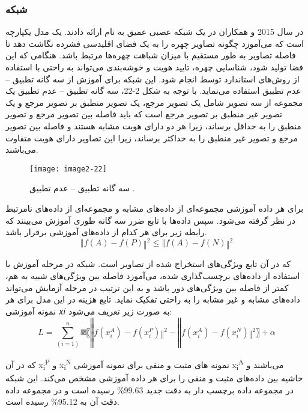 \subsubsection{	شبکه }
در سال 2015  و همکاران در \cite{7298682} یک شبکه عصبی عمیق به نام  ارائه دادند.  یک مدل یکپارچه است که می‌آموزد چگونه تصاویر چهره را به یک فضای اقلیدسی فشرده نگاشت دهد تا فاصله تصاویر به طور مستقیم با میزان شباهت چهره‌ها مرتبط باشد. هنگامی که این فضا تولید شود، شناسایی چهره، تایید هویت و خوشه‌بندی می‌تواند به راحتی با استفاده از روش‌های استاندارد توسط  انجام شود. این شبکه برای آموزش از سه گانه تطبیق – عدم تطبیق استفاده می‌نماید. با توجه به شکل 2-22، سه گانه تطبیق – عدم تطبیق یک مجموعه از سه تصویر شامل یک تصویر مرجع، یک تصویر منطبق بر تصویر مرجع و یک تصویر غیر منطبق بر تصویر مرجع است که باید فاصله بین تصویر مرجع و تصویر منطبق را به حداقل برساند، زیرا هر دو دارای هویت مشابه هستند و فاصله بین تصویر مرجع و تصویر غیر منطبق را به حداکثر برساند، زیرا این تصاویر دارای هویت متفاوت می‌باشند. 
 
 \begin{figure}[h]
\centering
  \texttt{[image: image2-22]}
  \caption{سه گانه تطبیق – عدم تطبیق \cite{ref1}.}
  \label{image2-22}
\end{figure}

\noindent 
برای هر داده آموزشی  مجموعه‌ای از داده‌های مشابه  و مجموعه‌ای از داده‌های نامرتبط  در نظر گرفته می‌شود. سپس داده‌ها با تابع ضرر سه گانه طوری آموزش می‌بینند که رابطه زیر برای هر کدام از داده‌های آموزشی برقرار باشد.
\begin{equation}\label{eq2-10}
‖f(A)-f(P)‖^2≤‖f(A)-f(N)‖^2	
\end{equation}

\noindent
که در آن تابع  ویژگی‌های استخراج شده از تصاویر است. شبكه در مرحله آموزش با استفاده از داده‌های برچسب‌گذاری شده، می‌آموزد فاصله بین ویژگی‌های شبیه به هم، کمتر از فاصله بین ویژگی‌های دور باشد و به این ترتیب در مرحله آزمایش می‌تواند داده‌های مشابه و غیر مشابه را به راحتی تفكیک نماید. تابع هزینه در این مدل برای هر نمونه آموزشی 𝑥𝑖  به صورت زیر تعریف می‌شود:
\begin{equation}\label{eq2-11}
L=∑_(i=1)^n▒〖‖f(x_i^A )-f(x_i^P)‖^2-‖f(x_i^A )-f(x_i^N)‖^2 〗+α	
\end{equation}

\noindent
که در آن
x\textsubscript{i}\textsuperscript{P}   
و
x\textsubscript{i}\textsuperscript{N}   
نمونه های مثبت و منفی برای نمونه آموزشی
x\textsubscript{i}\textsuperscript{A}
می‌باشند و  حاشیه بین داده‌های مثبت و منفی را برای هر داده آموزشی مشخص می‌کند. این شبکه در مجموعه داده برچسب دار  به دقت جدید 99.63\% رسیده است و در مجموعه داده
دقت آن به 95.12\% رسیده است.
	
